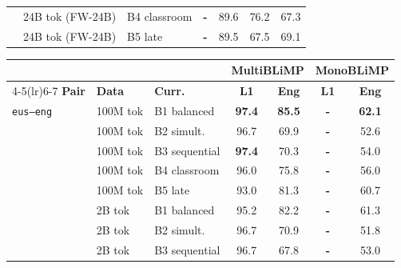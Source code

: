\documentclass[11pt]{article}
\begin{document}
\begin{table}[ht!]
\begin{minipage}[t]{0.49\linewidth}
\begin{tabular}{ll l cc cc}
 & 24B tok (FW-24B) & B4 classroom & \textbf{-} & \cellcolor[rgb]{0.784,1.000,0.784} 89.6 & \cellcolor[rgb]{0.824,1.000,0.824} 76.2 & \cellcolor[rgb]{0.865,1.000,0.865} 67.3 \\
 & 24B tok (FW-24B) & B5 late & \textbf{-} & \cellcolor[rgb]{0.785,1.000,0.785} 89.5 & \cellcolor[rgb]{0.892,1.000,0.892} 67.5 & \cellcolor[rgb]{0.852,1.000,0.852} 69.1 \\
\bottomrule
\end{tabular}
\end{minipage}\hfill
\begin{minipage}[t]{0.49\linewidth}\centering
\begin{tabular}{ll l cc cc}
\toprule
& & & \multicolumn{2}{c}{\textbf{MultiBLiMP}} & \multicolumn{2}{c}{\textbf{MonoBLiMP}} \\
\cmidrule(lr){4-5}\cmidrule(lr){6-7}
\textbf{Pair} & \textbf{Data} & \textbf{Curr.} & \textbf{L1} & \textbf{Eng} & \textbf{L1} & \textbf{Eng} \\
\midrule
\texttt{eus--eng} & 100M tok & B1 balanced & \cellcolor[rgb]{0.738,1.000,0.738} \textbf{97.4} & \cellcolor[rgb]{0.806,1.000,0.806} \textbf{85.5} & \textbf{-} & \cellcolor[rgb]{0.900,1.000,0.900} \textbf{62.1} \\
 & 100M tok & B2 simult. & \cellcolor[rgb]{0.742,1.000,0.742} 96.7 & \cellcolor[rgb]{0.891,1.000,0.891} 69.9 & \textbf{-} & \cellcolor[rgb]{0.979,1.000,0.979} 52.6 \\
 & 100M tok & B3 sequential & \cellcolor[rgb]{0.738,1.000,0.738} \textbf{97.4} & \cellcolor[rgb]{0.889,1.000,0.889} 70.3 & \textbf{-} & \cellcolor[rgb]{0.967,1.000,0.967} 54.0 \\
 & 100M tok & B4 classroom & \cellcolor[rgb]{0.745,1.000,0.745} 96.0 & \cellcolor[rgb]{0.859,1.000,0.859} 75.8 & \textbf{-} & \cellcolor[rgb]{0.951,1.000,0.951} 56.0 \\
 & 100M tok & B5 late & \cellcolor[rgb]{0.762,1.000,0.762} 93.0 & \cellcolor[rgb]{0.829,1.000,0.829} 81.3 & \textbf{-} & \cellcolor[rgb]{0.912,1.000,0.912} 60.7 \\
\addlinespace[1.5pt]
 & 2B tok & B1 balanced & \cellcolor[rgb]{0.750,1.000,0.750} 95.2 & \cellcolor[rgb]{0.824,1.000,0.824} 82.2 & \textbf{-} & \cellcolor[rgb]{0.907,1.000,0.907} 61.3 \\
 & 2B tok & B2 simult. & \cellcolor[rgb]{0.742,1.000,0.742} 96.7 & \cellcolor[rgb]{0.886,1.000,0.886} 70.9 & \textbf{-} & \cellcolor[rgb]{0.985,1.000,0.985} 51.8 \\
 & 2B tok & B3 sequential & \cellcolor[rgb]{0.742,1.000,0.742} 96.7 & \cellcolor[rgb]{0.903,1.000,0.903} 67.8 & \textbf{-} & \cellcolor[rgb]{0.975,1.000,0.975} 53.0 \\

\end{tabular}
\end{minipage}
\end{table}
\end{document}
